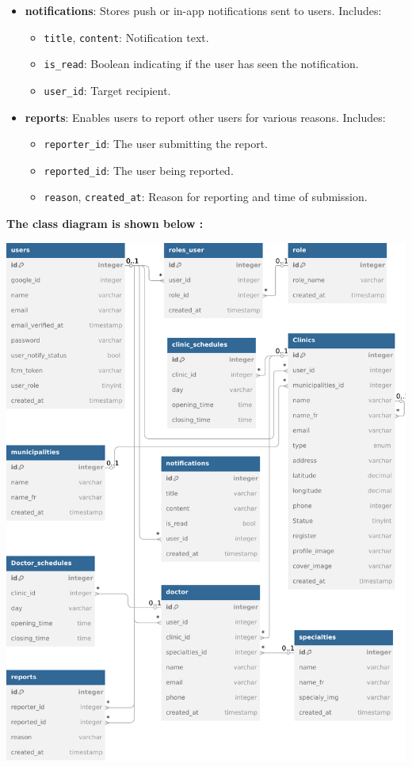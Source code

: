 \documentclass[12pt]{report}
\begin{document}
\begin{itemize}
	\item \textbf{notifications}: Stores push or in-app notifications sent to users. Includes:
	\begin{itemize}
		\item \texttt{title}, \texttt{content}: Notification text.
		\item \texttt{is\_read}: Boolean indicating if the user has seen the notification.
		\item \texttt{user\_id}: Target recipient.
	\end{itemize}

	\item \textbf{reports}: Enables users to report other users for various reasons. Includes:
	\begin{itemize}
		\item \texttt{reporter\_id}: The user submitting the report.
		\item \texttt{reported\_id}: The user being reported.
		\item \texttt{reason}, \texttt{created\_at}: Reason for reporting and time of submission.
	\end{itemize}

\end{itemize}
\vspace{4cm}
\begin{center}
	\textbf{ The class diagram is shown below : }
\end{center}
\begin{center}
	\hspace*{-0.4cm}\includegraphics[width=1.1\textwidth]{images/dbclass.pdf}
\end{center}
\end{document}

